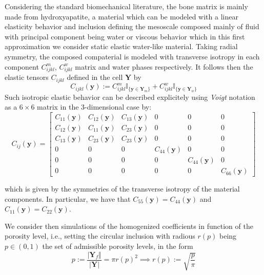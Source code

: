 Considering the standard biomechanical literature, the bone matrix is mainly made from hydroxyapatite, a material which can be modeled with a linear elasticity behavior and inclusion defining the mesoscale composed mainly of fluid with principal component being water or viscous behavior which in this first approximation we consider static elastic water-like material. Taking radial symmetry, the composed compaterial is modeled with transverse isotropy in each component $C^m_{ijkl}$, $C^w_{ijkl}$ matrix and water phases respectively.
It follows then the elastic tensors $C_{ijkl}$ defined in the cell $\mathbf{Y}$ by
\begin{equation*}
    C_{ijkl} (\mathbf{y}) := C^m_{ijkl} \mathbb{I}_{\{\mathbf{y} \in  \mathbf{Y}_{m}\}} + C^w_{ijkl} \mathbb{I}_{\{ \mathbf{y} \in \mathbf{Y}_{w}\}}
\end{equation*}
Such isotropic elastic behavior can be described explicitely using \textit{Voigt} notation as a $6\times 6$ matrix in the 3-dimensional case by:
\begin{equation*}
    C_{ij}(\mathbf{y}) = 
    \begin{bmatrix}
    C_{11}(\mathbf{y}) & C_{12}(\mathbf{y}) & C_{13}(\mathbf{y}) & 0 & 0 & 0 \\
    C_{12}(\mathbf{y}) & C_{11}(\mathbf{y}) & C_{23}(\mathbf{y}) & 0 & 0 & 0 \\
    C_{13}(\mathbf{y}) & C_{23}(\mathbf{y}) & C_{23}(\mathbf{y}) & 0 & 0 & 0 \\
    0 & 0 & 0 & C_{44}(\mathbf{y}) & 0 & 0 \\
    0 & 0 & 0 & 0 & C_{44}(\mathbf{y}) & 0 \\
    0 & 0 & 0 & 0 & 0 & C_{66}(\mathbf{y}) 
    \end{bmatrix}
\end{equation*}

which is given by the symmetries of the transverse isotropy of the material components. In particular, we have that $C_{55}(\mathbf{y}) = C_{44}(\mathbf{y})$ and $C_{11}(\mathbf{y}) = C_{22}(\mathbf{y})$.

We consider then simulations of the homogenized coefficients in function of the porosity level, i.e., setting the circular inclusion with radious $r(p)$ being $p \in (0,1)$ the set of admissible porosity levels, in the form 
\begin{equation*}
    p := \frac{\vert \mathbf{Y}_f \Vert }{\vert \mathbf{Y}\vert} = \pi r(p)^2 \implies r(p) := \sqrt{\frac{p}{\pi}}
\end{equation*}

